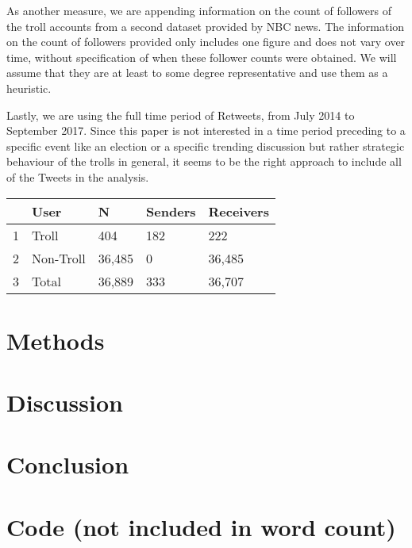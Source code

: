 \documentclass[12pt, titlepage=true, toc=bib]{scrartcl}
\begin{document}
As another measure, we are appending information on the count of followers of the troll accounts from a second dataset provided by NBC news. The information on the count of followers provided only includes one figure and does not vary over time, without specification of when these follower counts were obtained. We will assume that they are at least to some degree representative and use them as a heuristic. 

Lastly, we are using the full time period of Retweets, from July 2014 to September 2017. Since this paper is not interested in a time period preceding to a specific event like an election or a specific trending discussion but rather strategic behaviour of the trolls in general, it seems to be the right approach to include all of the Tweets in the analysis.

\begin{table}[ht]
\centering
\begin{tabular}{rllll}
  \hline
 & User & N & Senders & Receivers \\ 
  \hline
1 & Troll & 404 & 182 & 222 \\ 
  2 & Non-Troll & 36,485 & 0 & 36,485 \\ 
  3 & Total & 36,889 & 333 & 36,707 \\ 
   \hline
\end{tabular}
\end{table}

\section{Methods}

\section{Discussion}

\section{Conclusion}

\section{Code (not included in word count)}



\newpage

\printbibliography
\end{document}
